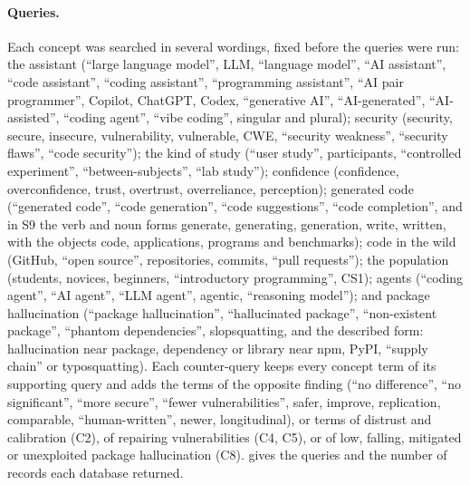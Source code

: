 \paragraph{Queries.}
Each concept was searched in several wordings, fixed before the queries were
run: the assistant (\enquote{large language model}, LLM, \enquote{language
model}, \enquote{AI assistant}, \enquote{code assistant}, \enquote{coding
assistant}, \enquote{programming assistant}, \enquote{AI pair programmer},
Copilot, ChatGPT, Codex, \enquote{generative AI}, \enquote{AI-generated},
\enquote{AI-assisted}, \enquote{coding agent}, \enquote{vibe coding},
singular and plural); security (security, secure, insecure, vulnerability,
vulnerable, CWE, \enquote{security weakness}, \enquote{security flaws},
\enquote{code security}); the kind of study (\enquote{user study},
participants, \enquote{controlled experiment}, \enquote{between-subjects},
\enquote{lab study}); confidence (confidence, overconfidence, trust,
overtrust, overreliance, perception); generated code (\enquote{generated
code}, \enquote{code generation}, \enquote{code suggestions}, \enquote{code
completion}, and in S9 the verb and noun forms generate, generating,
generation, write, written, with the objects code, applications, programs
and benchmarks); code in the wild (GitHub, \enquote{open source},
repositories, commits, \enquote{pull requests}); the population (students,
novices, beginners, \enquote{introductory programming}, CS1); agents
(\enquote{coding agent}, \enquote{AI agent}, \enquote{LLM agent}, agentic,
\enquote{reasoning model}); and package hallucination (\enquote{package
hallucination}, \enquote{hallucinated package}, \enquote{non-existent
package}, \enquote{phantom dependencies}, slopsquatting, and the described
form: hallucination near package, dependency or library near npm, PyPI,
\enquote{supply chain} or typosquatting).
Each counter-query keeps every concept term of its supporting query and adds
the terms of the opposite finding (\enquote{no difference}, \enquote{no
significant}, \enquote{more secure}, \enquote{fewer vulnerabilities}, safer,
improve, replication, comparable, \enquote{human-written}, newer,
longitudinal), or terms of distrust and calibration (C2), of repairing
vulnerabilities (C4, C5), or of low, falling, mitigated or unexploited
package hallucination (C8).
 gives the queries and the number of records
each database returned.


